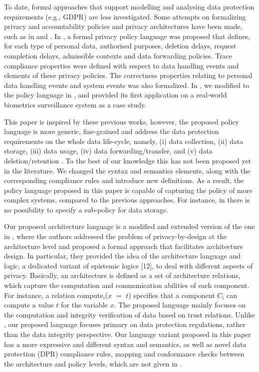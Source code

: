 \documentclass[a4paper]{article}
\begin{document}
To date, formal approaches that support modelling and analysing  
data protection requirements (e.g., GDPR) are less investigated. Some attempts on formalizing privacy and accountability policies and privacy architectures have been made, such as in \cite{TaButin15, ButinFM14} and \cite{TaAntignac14, Antignac14}. In \cite{ButinFM14}, a formal privacy policy language was proposed that defines, for each  type of personal data, authorised purposes, deletion delays, request 
completion delays, admissible contexts and data forwarding policies. Trace compliance properties were defined with respect to data handling events 
and elements of these privacy policies. The correctness properties relating to personal data handling events and system events was also formalized. In \cite{TaButin15}, we modified to the policy language in  \cite{ButinFM14}, and provided its first application on a real-world biometrics surveillance system as a case study.   

This paper is inspired by these previous works, however, the proposed  policy language is more generic, fine-grained and address the data protection requirements on the whole data life-cycle, namely, (i) data collection, (ii) data storage, (iii) data usage, (iv) data forwarding/transfer, and (v) data deletion/retention \cite{ButinTN15}. To the best of our knowledge this has not been proposed yet in the literature. We changed the syntax and semantics elements, along with the corresponding compliance rules and introduce new definitions.  As a result, the policy language proposed in this paper is capable of capturing the policy of more complex systems, compared to the previous approaches. For instance, in \cite{ButinFM14} there is no possibility to specify a sub-policy for data storage. 

Our proposed architecture language is a modified and extended version of the one in \cite{Antignac14}, where the authors addressed the problem of privacy-by-design at the architecture level and proposed a formal approach that facilitates architecture design. In particular, they provided the idea of the architecture language and logic, a dedicated variant of epistemic logics [12], to deal with different aspects of privacy. Basically, an architecture is defined as a set
of architecture relations, which capture the computation and communication 
abilities of each component. For instance, a relation compute$_i$($x$ $=$ $t$) specifies
that a component $C_i$ can compute a value $t$ for the variable $x$. The proposed language mainly focuses on the computation and integrity verification of data based on trust relations. Unlike \cite{Antignac14}, our proposed language focuses primary on data protection regulations, rather than the data integrity perspective. Our language variant proposed in this paper has a more expressive and different syntax and semantics, as well as novel data protection (DPR) compliance rules,  mapping and conformance checks between the architecture and policy levels, which are not given in \cite{Antignac14}.  
\end{document}
